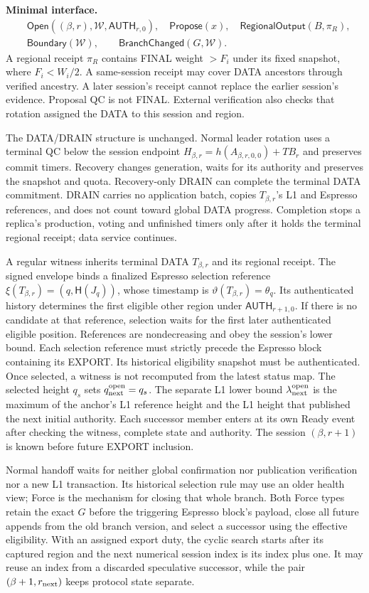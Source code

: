 \documentclass[11pt,a4paper]{article}
\newcommand{\api}[1]{\ensuremath{\mathsf{#1}}}
\newcommand{\Hash}{\mathsf H}
\newcommand{\TB}{\mathit{TB}}
\newcommand{\iface}{\textbf{Minimal interface.}\ }
\begin{document}
\iface
\[
\begin{aligned}
 &\api{Open}((\beta,r),\mathcal W,\api{AUTH}_{r,0}),\quad
   \api{Propose}(x),\quad \api{RegionalOutput}(B,\pi_R),\\
 &\api{Boundary}(\mathcal W),\qquad
   \api{BranchChanged}(G,\mathcal W).
\end{aligned}
\]
A regional receipt $\pi_R$ contains FINAL weight $>F_i$ under its fixed
snapshot, where $F_i<W_i/2$. A same-session receipt may cover DATA
ancestors through verified ancestry. A later session's receipt cannot
replace the earlier session's evidence. Proposal QC is not FINAL.
External verification also checks that rotation assigned the DATA to
this session and region.

The DATA/DRAIN structure is unchanged. Normal leader rotation uses a
terminal QC below the session endpoint
$H_{\beta,r}=h(A_{\beta,r,0,0})+\TB_r$ and preserves commit timers. Recovery changes
generation, waits for its authority and preserves the snapshot and
quota. Recovery-only DRAIN can complete the terminal DATA commitment.
DRAIN carries no application batch, copies $T_{\beta,r}$'s L1 and Espresso
references, and does not count toward global DATA progress. Completion
stops a replica's production, voting and
unfinished timers only after it holds the terminal regional receipt;
data service continues.

A regular witness inherits terminal DATA $T_{\beta,r}$ and its regional receipt.
The signed envelope binds a finalized Espresso selection reference
$\xi(T_{\beta,r})=(q,\Hash(J_q))$, whose timestamp is $\vartheta(T_{\beta,r})=\theta_q$.
Its authenticated history determines the first eligible other region
under $\api{AUTH}_{r+1,0}$. If there is no candidate at that reference,
selection waits for the first later authenticated eligible position.
References are nondecreasing and obey the session's lower bound. Each
selection reference must strictly precede the Espresso block containing
its EXPORT. Its historical eligibility snapshot must be authenticated.
Once selected, a witness is not recomputed from the latest status map.
The selected height $q_s$ sets $q^{\rm open}_{\rm next}=q_s$. The
separate L1 lower bound $\lambda^{\rm open}_{\rm next}$ is the maximum
of the anchor's L1 reference height and the L1 height that published
the next initial authority.
Each successor member enters at its own Ready event after checking the
witness, complete state and authority. The session $(\beta,r+1)$ is known before
future EXPORT inclusion.

Normal handoff waits for neither global confirmation nor publication
verification nor a new L1 transaction. Its historical selection rule
may use an older health view; Force is the mechanism for closing that
whole branch. Both Force types retain the exact $G$ before the triggering
Espresso block's payload, close all future appends from the old branch version,
and select a successor using the effective eligibility. With an assigned
export duty, the cyclic search starts after its captured region and the
next numerical session index is its index plus one. It may reuse an
index from a discarded speculative successor, while the pair
$(\beta+1,r_{\rm next})$ keeps protocol state separate.
\end{document}
